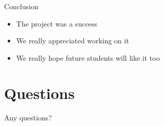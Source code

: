 \documentclass{beamer}
\begin{document}
    \begin{frame}{Conclusion}
      \begin{itemize}
        \item The project was a success
        \item We really appreciated working on it
        \item We really hope future students will like it too
      \end{itemize}
    \end{frame}

  \section*{Questions}
    \begin{frame}
      Any questions?
    \end{frame}
\end{document}
